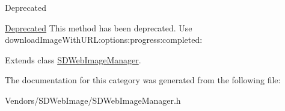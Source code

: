 \begin{DoxyRefDesc}{Deprecated}
\item[\hyperlink{deprecated__deprecated000055}{Deprecated}]This method has been deprecated. Use {\ttfamily download\+Image\+With\+U\+R\+L\+:options\+:progress\+:completed\+:} \end{DoxyRefDesc}


Extends class \hyperlink{interface_s_d_web_image_manager_a76672529aa9425cbdf50d79528040942}{S\+D\+Web\+Image\+Manager}.



The documentation for this category was generated from the following file\+:\begin{DoxyCompactItemize}
\item 
Vendors/\+S\+D\+Web\+Image/S\+D\+Web\+Image\+Manager.\+h\end{DoxyCompactItemize}
